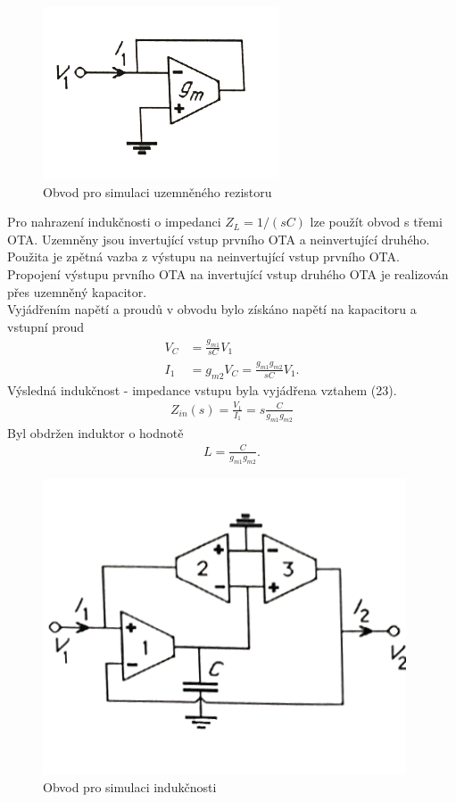 \documentclass[twoside]{article}
\begin{document}
\begin{figure}[H]
\centering
\includegraphics[scale=0.7]{image10.png}
\caption{Obvod pro simulaci uzemněného rezistoru \cite{8}}
\end{figure}
\noindent Pro nahrazení indukčnosti o impedanci $Z_L = 1/(sC)$ lze použít obvod s třemi OTA. Uzemněny jsou invertující vstup prvního OTA a neinvertující druhého. Použita je zpětná vazba z výstupu na neinvertující vstup prvního OTA. Propojení výstupu prvního OTA na invertující vstup druhého OTA je realizován přes uzemněný kapacitor. \\
Vyjádřením napětí a proudů v obvodu bylo získáno napětí na kapacitoru a vstupní proud
\begin{align}
V_C &= \frac{g_{m1}}{sC}V_1 \\
I_1 &= g_{m2}V_C = \frac{g_{m1}g_{m2}}{sC}V_1.
\end{align}
Výsledná indukčnost - impedance vstupu byla vyjádřena vztahem (23).
\begin{align}
Z_{in}(s) = \frac{V_1}{I_1} = s\frac{C}{g_{m1}g_{m2}}
\end{align}
\noindent Byl obdržen induktor o hodnotě
\begin{align}
L = \frac{C}{g_{m1}g_{m2}}.
\end{align}
\begin{figure}[H]
\centering
\includegraphics[scale=0.55]{image13.png}
\caption{Obvod pro simulaci indukčnosti \cite{8}}
\end{figure}
\end{document}
